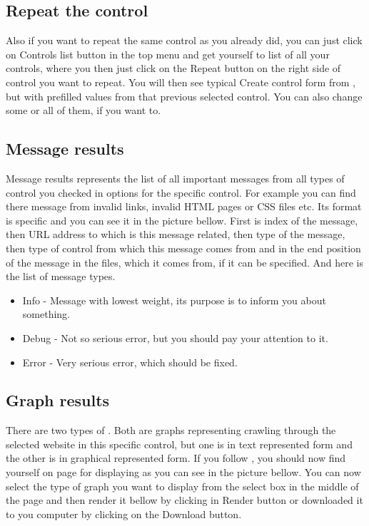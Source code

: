 \documentclass[12pt,a4paper]{article}
\begin{document}
\subsection{Repeat the control}
Also if you want to repeat the same control as you already did, you can just click on Controls list button in the top menu and get yourself to list of all your controls, where you then just click on the Repeat button on the right side of control you want to repeat. You will then see typical Create control form from , but with prefilled values from that previous selected control. You can also change some or all of them, if you want to.
\subsection{Message results} \label{messages}
Message results represents the list of all important messages from all types of control you checked in options for the specific control. For example you can find there message from invalid links, invalid HTML pages or CSS files etc. Its format is specific and you can see it in the picture bellow. First is index of the message, then URL address to which is this message related, then type of the message, then type of control from which this message comes from and in the end position of the message in the files, which it comes from, if it can be specified.
And here is the list of message types.
\begin{itemize}
	\item Info - Message with lowest weight, its purpose is to inform you about something.
	\item Debug - Not so serious error, but you should pay your attention to it.
	\item Error - Very serious error, which should be fixed.
\end{itemize}

\subsection{Graph results} \label{graph}
There are two types of . Both are graphs representing crawling through the selected website in this specific control, but one  is in text represented form and the other  is in graphical represented form. If you follow , you should now find yourself on page for displaying  as you can see in the picture bellow. You can now select the type of graph you want to display from the select box in the middle of the page and then render it bellow by clicking in Render button or downloaded it to you computer by clicking on the Download button.
\end{document}

